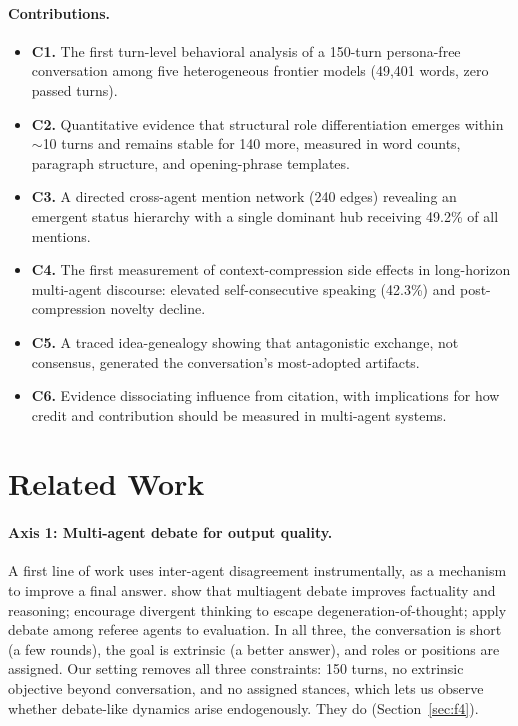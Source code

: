 \documentclass[sigconf,nonacm=true]{acmart}
\begin{document}
\paragraph{Contributions.}
\begin{itemize}[leftmargin=1.2em]
\item \textbf{C1.} The first turn-level behavioral analysis of a 150-turn persona-free conversation among five heterogeneous frontier models (49{,}401 words, zero passed turns).
\item \textbf{C2.} Quantitative evidence that structural role differentiation emerges within $\sim$10 turns and remains stable for 140 more, measured in word counts, paragraph structure, and opening-phrase templates.
\item \textbf{C3.} A directed cross-agent mention network (240 edges) revealing an emergent status hierarchy with a single dominant hub receiving 49.2\% of all mentions.
\item \textbf{C4.} The first measurement of context-compression side effects in long-horizon multi-agent discourse: elevated self-consecutive speaking (42.3\%) and post-compression novelty decline.
\item \textbf{C5.} A traced idea-genealogy showing that antagonistic exchange, not consensus, generated the conversation's most-adopted artifacts.
\item \textbf{C6.} Evidence dissociating influence from citation, with implications for how credit and contribution should be measured in multi-agent systems.
\end{itemize}

\section{Related Work}
\label{sec:related}

\paragraph{Axis 1: Multi-agent debate for output quality.} A first line of work uses inter-agent disagreement instrumentally, as a mechanism to improve a final answer. \citet{du2023debate} show that multiagent debate improves factuality and reasoning; \citet{liang2023encouraging} encourage divergent thinking to escape degeneration-of-thought; \citet{chan2023chateval} apply debate among referee agents to evaluation. In all three, the conversation is short (a few rounds), the goal is extrinsic (a better answer), and roles or positions are assigned. Our setting removes all three constraints: 150 turns, no extrinsic objective beyond conversation, and no assigned stances, which lets us observe whether debate-like dynamics arise endogenously. They do (Section~\ref{sec:f4}).
\end{document}

